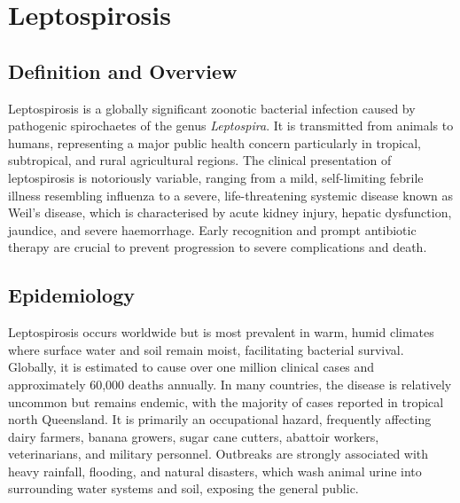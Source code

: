 \chapter{Leptospirosis}

\section*{Definition and Overview}
Leptospirosis is a globally significant zoonotic bacterial infection caused by pathogenic spirochaetes of the genus \textit{Leptospira}. It is transmitted from animals to humans, representing a major public health concern particularly in tropical, subtropical, and rural agricultural regions. The clinical presentation of leptospirosis is notoriously variable, ranging from a mild, self-limiting febrile illness resembling influenza to a severe, life-threatening systemic disease known as Weil's disease, which is characterised by acute kidney injury, hepatic dysfunction, jaundice, and severe haemorrhage. Early recognition and prompt antibiotic therapy are crucial to prevent progression to severe complications and death.

\section*{Epidemiology}
Leptospirosis occurs worldwide but is most prevalent in warm, humid climates where surface water and soil remain moist, facilitating bacterial survival. Globally, it is estimated to cause over one million clinical cases and approximately 60,000 deaths annually. In many countries, the disease is relatively uncommon but remains endemic, with the majority of cases reported in tropical north Queensland. It is primarily an occupational hazard, frequently affecting dairy farmers, banana growers, sugar cane cutters, abattoir workers, veterinarians, and military personnel. Outbreaks are strongly associated with heavy rainfall, flooding, and natural disasters, which wash animal urine into surrounding water systems and soil, exposing the general public.

